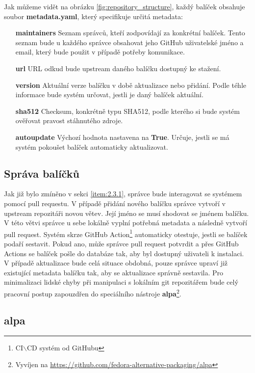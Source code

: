 \documentclass[
  digital,     %
  oneside,     %
  nosansbold,  %
  nocolorbold, %
  lof,         %
  lot,         %
]{fithesis4}
\begin{document}
Jak můžeme vidět na obrázku \ref{fig:repository_structure}, každý
balíček obsahuje soubor \textbf{metadata.yaml}, který specifikuje
určitá metadata:

\begin{itemize}
    \item[\textbf{maintainers}] Seznam správců, kteří zodpovídají za
    konkrétní balíček. Tento seznam bude u každého správce obsahovat
    jeho GitHub uživatelské jméno a email, který bude použit v případě
    potřeby komunikace.
    \item[\textbf{url}] URL odkud bude upstream daného balíčku dostupný 
    ke stažení.
    \item[\textbf{version}] Aktuální verze balíčku v době aktualizace
    nebo přidání. Podle téhle informace bude systém určovat, jestli je
    daný balíček aktuální.
    \item[\textbf{sha512}] Checksum, konkrétně typu SHA512, podle kterého
    si bude systém ověřovat pravost stáhnutého zdroje.
    \item[\textbf{autoupdate}] Výchozí hodnota nastavena na \textbf{True}.
    Určuje, jestli se má systém pokoušet balíček automaticky aktualizovat.
\end{itemize}


\subsection{Správa balíčků}

Jak již bylo zmíněno v sekci \ref{item:2.3.1}, správce bude interagovat
se systémem pomocí pull requestu. V případě přidání nového balíčku
správce vytvoří v upstream repozitáři novou větev. Její jméno se musí
shodovat se jménem balíčku. V této větvi správce u sebe lokálně vyplní
potřebná metadata a následně vytvoří pull request. Systém skrze GitHub
Action\footnote{CI$\backslash$CD systém od  GitHubu\cite{gh_actions}}
automaticky otestuje, jestli se balíček podaří sestavit. Pokud ano, může
správce pull request potvrdit a přes GitHub Actions se balíček pošle do
databáze tak, aby byl dostupný uživateli k instalaci. V případě aktualizace
bude celá situace obdobná, pouze správce upraví již existující metadata 
balíčku tak, aby se aktualizace správně sestavila. Pro minimalizaci
lidské chyby při manipulaci s lokálním git repozitářem bude celý
pracovní postup zapouzdřen do speciálního nástroje 
\textbf{alpa}\footnote{Vyvíjen na
\url{https://github.com/fedora-alternative-packaging/alpa}}.


\subsection{alpa}
\end{document}

